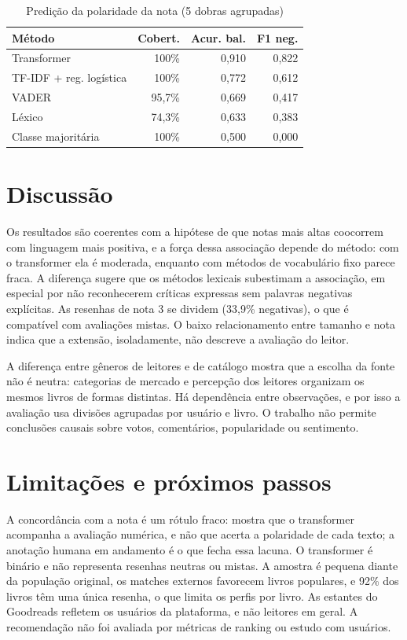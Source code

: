 \documentclass[conference]{IEEEtran}
\begin{document}
\begin{table}[!t]
\caption{Predição da polaridade da nota (5 dobras agrupadas)}
\label{tab:predicao}
\centering
\begin{tabular}{lrrr}
\toprule
\textbf{Método} & \textbf{Cobert.} & \textbf{Acur. bal.} & \textbf{F1 neg.}\\
\midrule
Transformer & 100\% & 0,910 & 0,822\\
TF-IDF + reg. logística & 100\% & 0,772 & 0,612\\
VADER & 95,7\% & 0,669 & 0,417\\
Léxico & 74,3\% & 0,633 & 0,383\\
Classe majoritária & 100\% & 0,500 & 0,000\\
\bottomrule
\end{tabular}
\end{table}

\section{Discussão}

Os resultados são coerentes com a hipótese de que notas mais altas coocorrem
com linguagem mais positiva, e a força dessa associação depende do método: com
o transformer ela é moderada, enquanto com métodos de vocabulário fixo parece
fraca. A diferença sugere que os métodos lexicais subestimam a associação, em
especial por não reconhecerem críticas expressas sem palavras negativas
explícitas. As resenhas de nota 3 se dividem (33,9\% negativas), o que é
compatível com avaliações mistas. O baixo relacionamento entre tamanho e nota
indica que a extensão, isoladamente, não descreve a avaliação do leitor.

A diferença entre gêneros de leitores e de catálogo mostra que a escolha da
fonte não é neutra: categorias de mercado e percepção dos leitores organizam os
mesmos livros de formas distintas. Há dependência entre observações, e por isso
a avaliação usa divisões agrupadas por usuário e livro. O trabalho não permite
conclusões causais sobre votos, comentários, popularidade ou sentimento.

\section{Limitações e próximos passos}

A concordância com a nota é um rótulo fraco: mostra que o transformer acompanha
a avaliação numérica, e não que acerta a polaridade de cada texto; a anotação
humana em andamento é o que fecha essa lacuna. O transformer é binário e não
representa resenhas neutras ou mistas. A amostra é pequena diante da população
original, os matches externos favorecem livros populares, e 92\% dos livros
têm uma única resenha, o que limita os perfis por livro. As estantes do
Goodreads refletem os usuários da plataforma, e não leitores em geral. A
recomendação não foi avaliada por métricas de ranking ou estudo com usuários.
\end{document}
